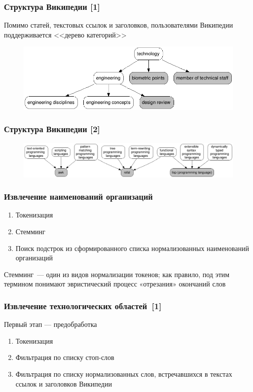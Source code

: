 \documentclass{beamer}
\begin{document}
\begin{frame}\frametitle{Структура Википедии [1]}
Помимо статей, текстовых ссылок и заголовков, пользователями Википедии поддерживается <<дерево категорий>>

\begin{figure}[ht]
\begin{center}
\includegraphics[width=4.5in]{chart_categories.png}
\end{center}
\end{figure}

\end{frame}
\begin{frame}\frametitle{Структура Википедии [2]}

\begin{figure}[ht]
\begin{center}
\includegraphics[width=4.5in]{chart_languages.png}
\end{center}
\end{figure}
\end{frame}


\begin{frame}\frametitle{Извлечение наименований организаций}
\begin{enumerate}
\item Токенизация
\item Стемминг
\item Поиск подстрок из сформированного списка нормализованных наименований организаций
\end{enumerate}
Стемминг --- один из видов нормализации токенов; как правило, под этим термином понимают эвристический процесс «отрезания» окончаний слов
\end{frame}

\begin{frame}\frametitle{Извлечение технологических областей~[1]}
Первый этап --- предобработка
        \begin{enumerate}
		\item Токенизация
		\item Фильтрация по списку стоп-слов
		\item Фильтрация по списку нормализованных слов, встречавшихся в текстах ссылок и заголовков Википедии
        \end{enumerate}

\end{frame}
\end{document}
